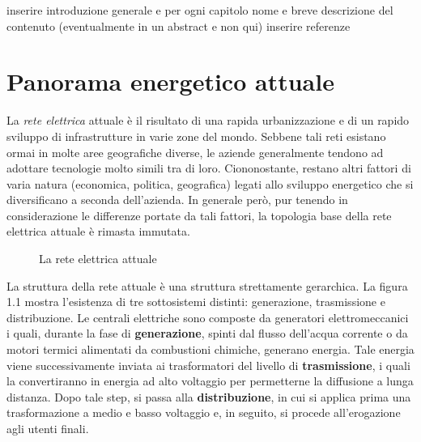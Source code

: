 inserire introduzione generale e per ogni capitolo nome e breve descrizione del contenuto (eventualmente in un abstract e non qui)\newline
inserire referenze 
\section{Panorama energetico attuale}
La \textit{rete elettrica} attuale è il risultato di una rapida urbanizzazione e di un rapido sviluppo di infrastrutture in varie zone del mondo. Sebbene tali reti esistano ormai in molte aree geografiche diverse, le aziende generalmente tendono ad adottare tecnologie molto simili tra di loro. Ciononostante, restano altri fattori  di varia natura (economica, politica, geografica) legati allo sviluppo energetico che si diversificano a seconda dell'azienda. \newline
In generale però, pur tenendo in considerazione le differenze portate da tali fattori, la topologia base della rete elettrica attuale è rimasta immutata.
\begin{figure}[h] 
\caption{La rete elettrica attuale}
\end{figure}
\newline La struttura della rete attuale è una struttura strettamente gerarchica. La figura 1.1 mostra l'esistenza di tre sottosistemi distinti: generazione, trasmissione e distribuzione. \newline Le centrali elettriche sono composte da generatori elettromeccanici i quali, durante la fase di \textbf{generazione}, spinti dal flusso dell'acqua corrente o da motori termici alimentati da combustioni chimiche, generano energia. Tale energia viene successivamente inviata ai trasformatori del livello di \textbf{trasmissione}, i quali la convertiranno in energia ad alto voltaggio per permetterne la diffusione a lunga distanza. Dopo tale step, si passa alla \textbf{distribuzione}, in cui si applica prima una trasformazione a medio e basso voltaggio e, in seguito, si procede all'erogazione agli utenti finali.
